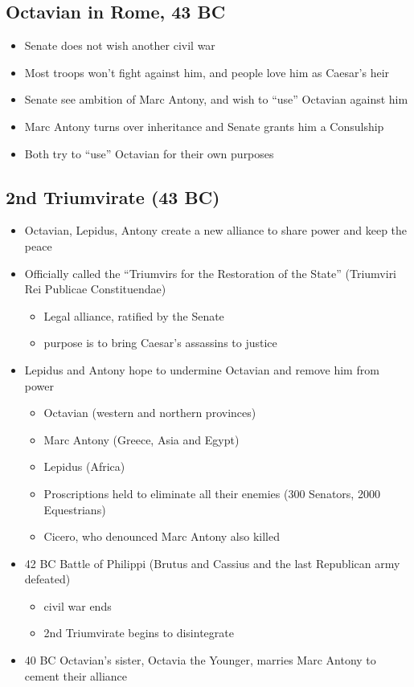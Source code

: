 \documentclass[12pt, twoside]{article}
\begin{document}
\subsection{Octavian in Rome, 43 BC}
\begin{itemize}
\item Senate does not wish another civil war
\item Most troops won’t fight against him, and people love him as Caesar’s heir
\item Senate see ambition of Marc Antony, and wish to “use” Octavian against him
\item Marc Antony turns over inheritance and Senate grants him a Consulship
\item Both try to “use” Octavian for their own purposes
\end{itemize}

\subsection{2nd Triumvirate (43 BC)}
\begin{itemize}
\item Octavian, Lepidus, Antony create a new alliance to share power and keep the peace
\item Officially called the “Triumvirs for the Restoration of the State” (Triumviri Rei Publicae Constituendae)
	\begin{itemize}
	\item Legal alliance, ratified by the Senate
	\item purpose is to bring Caesar’s assassins to justice
	\end{itemize}
\item Lepidus and Antony hope to undermine Octavian and remove him from power
	\begin{itemize}
	\item Octavian (western and northern provinces)
	\item Marc Antony (Greece, Asia and Egypt)
	\item Lepidus (Africa)
	\item Proscriptions held to eliminate all their enemies (300 Senators, 2000 Equestrians)
	\item Cicero, who denounced Marc Antony also killed
	\end{itemize}
\item 42 BC Battle of Philippi (Brutus and Cassius and the last Republican army defeated)
	\begin{itemize}
	\item civil war ends
	\item 2nd Triumvirate begins to disintegrate
	\end{itemize}
\item 40 BC Octavian’s sister, Octavia the Younger, marries Marc Antony to cement their alliance
\end{itemize}
\end{document}
